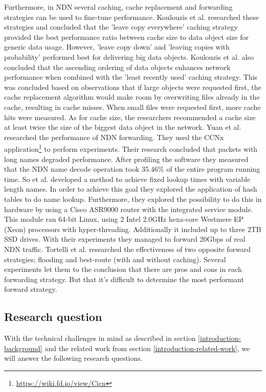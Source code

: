 Furthermore, in NDN several caching, cache replacement and forwarding strategies can be used to fine-tune performance. Koulouzis et al. researched these strategies and concluded that the 'leave copy everywhere' caching strategy provided the best performance ratio between cache size to data object size for generic data usage. However, 'leave copy down' and 'leaving copies with probability' performed best for delivering big data objects. Koulouzis et al. also concluded that the ascending ordering of data objects enhances network performance when combined with the 'least recently used' caching strategy. This was concluded based on observations that if large objects were requested first, the cache replacement algorithm would make room by overwriting files already in the cache, resulting in cache misses. When small files were requested first, more cache hits were measured. As for cache size, the researchers recommended a cache size at least twice the size of the biggest data object in the network. Yuan et al. \cite{yuan2012scalable} researched the performance of NDN forwarding. They used the CCNx application\footnote{\url{https://wiki.fd.io/view/Cicn}} to perform experiments. Their research concluded that packets with long names degraded performance. After profiling the software they measured that the NDN name decode operation took 35.46\% of the entire program running time. So et al. \cite{so2013named} developed a method to achieve fixed lookup times with variable length names. In order to achieve this goal they explored the application of hash tables to do name lookup. Furthermore, they explored the possibility to do this in hardware by using a Cisco ASR9000 router with the integrated service module. This module ran 64-bit Linux, using 2 Intel 2.0GHz hexa-core Westmere EP (Xeon) processors with hyper-threading. Additionally it included up to three 2TB SSD drives. With their experiments they managed to forward 20Gbps of real NDN traffic. Tortelli et al. \cite{tortelli2013performance} researched the effectiveness of two opposite forward strategies; flooding and best-route (with and without caching). Several experiments let them to the conclusion that there are pros and cons in each forwarding strategy. But that it's difficult to determine the most performant forward strategy.

\subsection{Research question}
\label{introduction-research-question}
With the technical challenges in mind as described in section \ref{introduction-background} and the related work from section \ref{introduction-related-work}, we will answer the following research questions. 

